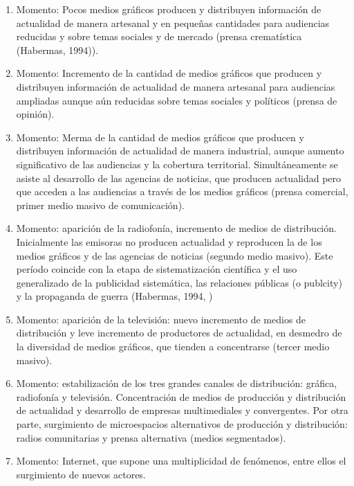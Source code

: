 \begin{enumerate}
	\item Momento: Pocos medios gráficos producen y distribuyen información de actualidad de manera artesanal y en pequeñas cantidades para audiencias reducidas y sobre temas sociales y de mercado (prensa crematística (Habermas, 1994)).

	\item Momento: Incremento de la cantidad de medios gráficos que producen y distribuyen información de actualidad de manera artesanal para audiencias ampliadas aunque aún reducidas sobre temas sociales y políticos (prensa de opinión).

	\item Momento: Merma de la cantidad de medios gráficos que producen y distribuyen información de actualidad de manera industrial, aunque aumento significativo de las audiencias y la cobertura territorial. Simultáneamente se asiste al desarrollo de las agencias de noticias, que producen actualidad pero que acceden a las audiencias a través de los medios gráficos (prensa comercial, primer medio masivo de comunicación).

	\item Momento: aparición de la radiofonía, incremento de medios de distribución. Inicialmente las emisoras no producen actualidad y reproducen la de los medios gráficos y de las agencias de noticias (segundo medio masivo). Este período coincide con la etapa de sistematización científica y el uso generalizado de la publicidad sistemática, las relaciones públicas (o publcity) y la propaganda de guerra (Habermas, 1994, \cite{@6972-BERNAYS2008})

	\item Momento: aparición de la televisión: nuevo incremento de medios de distribución y leve incremento de productores de actualidad, en desmedro de la diversidad de medios gráficos, que tienden a concentrarse (tercer medio masivo).

	\item Momento: estabilización de los tres grandes canales de distribución: gráfica, radiofonía y televisión. Concentración de medios de producción y distribución de actualidad y desarrollo de empresas multimediales y convergentes. Por otra parte, surgimiento de microespacios alternativos de producción y distribución: radios comunitarias y prensa alternativa (medios segmentados).

	\item Momento: Internet, que supone una multiplicidad de fenómenos, entre ellos el surgimiento de nuevos actores.


\end{enumerate}
